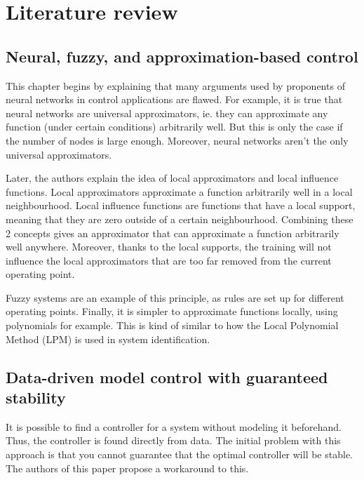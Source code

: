 \section{Literature review}

\subsection{Neural, fuzzy, and approximation-based control \cite{neural_fuzzy_approx-based_control}}

This chapter begins by explaining that many arguments used by proponents of neural networks in control applications are flawed. For example, it is true that neural networks are universal approximators, ie. they can approximate any function (under certain conditions) arbitrarily well. But this is only the case if the number of nodes is large enough. Moreover, neural networks aren't the only universal approximators.

Later, the authors explain the idea of local approximators and local influence functions. Local approximators approximate a function arbitrarily well in a local neighbourhood. Local influence functions are functions that have a local support, meaning that they are zero outside of a certain neighbourhood. Combining these 2 concepts gives an approximator that can approximate a function arbitrarily well anywhere. Moreover, thanks to the local supports, the training will not influence the local approximators that are too far removed from the current operating point.

Fuzzy systems are an example of this principle, as rules are set up for different operating points. Finally, it is simpler to approximate functions locally, using polynomials for example. This is kind of similar to how the Local Polynomial Method (LPM) is used in system identification.


\subsection{Data-driven model control with guaranteed stability \cite{Data-driven_model_reference_control}}
It is possible to find a controller for a system without modeling it beforehand. Thus, the controller is found directly from data. The initial problem with this approach is that you cannot guarantee that the optimal controller will be stable. The authors of this paper propose a workaround to this.

